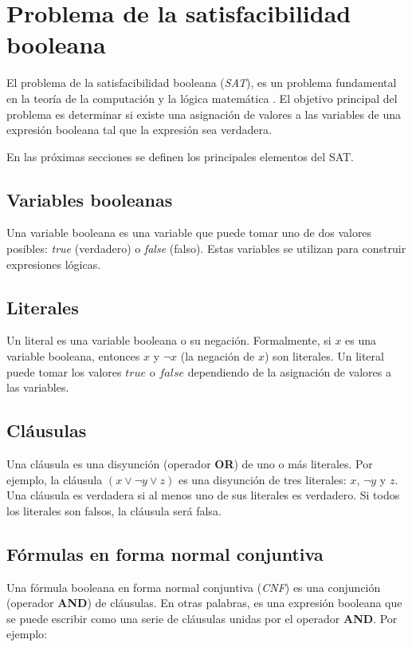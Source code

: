 \section{Problema de la satisfacibilidad booleana}

El problema de la satisfacibilidad booleana (\textit{SAT}), es un problema fundamental en la teoría de la 
computación y la lógica matemática \cite{authomataTheory}. El objetivo principal del problema es determinar si existe una asignación de valores a las variables de una expresión booleana tal que la expresión sea verdadera.

En las próximas secciones se definen los principales elementos del SAT.
\subsection{Variables booleanas}

Una variable booleana es una variable que puede tomar uno de dos valores posibles: \textit{true} (verdadero) o \textit{false} (falso). Estas variables se utilizan para construir expresiones lógicas.

\subsection{Literales}

Un literal es una variable booleana o su negación. Formalmente, si \( x \) es una variable booleana, entonces \( x \) y \( \neg x \) (la negación de \( x \)) son literales. Un literal puede tomar los valores \( true \) o \( false \) dependiendo de la asignación de valores a las variables.

\subsection{Cláusulas}

Una cláusula es una disyunción (operador \textbf{OR}) de uno o más literales. Por ejemplo, la cláusula \( (x \vee \neg y \vee z) \) es una disyunción de tres literales: \( x \), \( \neg y \) y \( z \). Una cláusula es verdadera si al menos uno de sus literales es verdadero. Si todos los literales son falsos, la cláusula será falsa.

\subsection{Fórmulas en forma normal conjuntiva}

Una fórmula booleana en forma normal conjuntiva (\textit{CNF}) es una conjunción (operador \textbf{AND}) de cláusulas. En otras palabras, es una expresión booleana que se puede escribir como una serie de cláusulas unidas por el operador \textbf{AND}. Por ejemplo:

